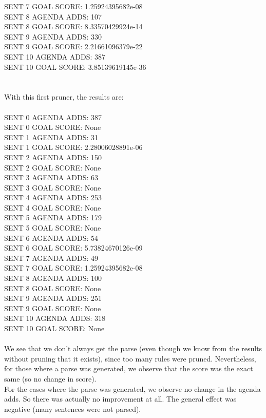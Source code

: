\documentclass{article}
\begin{document}
\begin{spacing}{1.1}
\begin{enumerate}
SENT 7 GOAL SCORE: 1.25924395682e-08\\
SENT 8 AGENDA ADDS: 107\\
SENT 8 GOAL SCORE: 8.33570429924e-14\\
SENT 9 AGENDA ADDS: 330\\
SENT 9 GOAL SCORE: 2.21661096379e-22\\
SENT 10 AGENDA ADDS: 387\\
SENT 10 GOAL SCORE: 3.85139619145e-36\\
\\
\\
With this first pruner, the results are:\\
\\
SENT 0 AGENDA ADDS: 387\\
SENT 0 GOAL SCORE: None\\
SENT 1 AGENDA ADDS: 31\\
SENT 1 GOAL SCORE: 2.28006028891e-06\\
SENT 2 AGENDA ADDS: 150\\
SENT 2 GOAL SCORE: None\\
SENT 3 AGENDA ADDS: 63\\
SENT 3 GOAL SCORE: None\\
SENT 4 AGENDA ADDS: 253\\
SENT 4 GOAL SCORE: None\\
SENT 5 AGENDA ADDS: 179\\
SENT 5 GOAL SCORE: None\\
SENT 6 AGENDA ADDS: 54\\
SENT 6 GOAL SCORE: 5.73824670126e-09\\
SENT 7 AGENDA ADDS: 49\\
SENT 7 GOAL SCORE: 1.25924395682e-08\\
SENT 8 AGENDA ADDS: 100\\
SENT 8 GOAL SCORE: None\\
SENT 9 AGENDA ADDS: 251\\
SENT 9 GOAL SCORE: None\\
SENT 10 AGENDA ADDS: 318\\
SENT 10 GOAL SCORE: None\\
\\
We see that we don't always get the parse (even though we know from the results without pruning that it exists), since too many rules were pruned. Nevertheless, for those where a parse was generated, we observe that the score was the exact same (so no change in score).\\
For the cases where the parse was generated, we observe no change in the agenda adds. So there was actually no improvement at all. The general effect was negative (many sentences were not parsed).\\

\end{enumerate}
\end{spacing}
\end{document}
